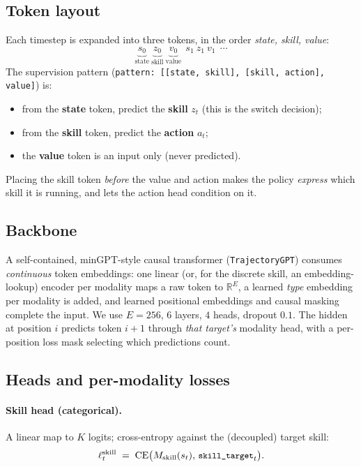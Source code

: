 \documentclass[11pt]{article}
\newcommand{\R}{\mathbb{R}}
\newcommand{\st}{s}
\newcommand{\skill}{z}
\newcommand{\code}[1]{\texttt{\small #1}}
\begin{document}
\subsection{Token layout}
Each timestep is expanded into three tokens, in the order \emph{state, skill, value}:
\begin{equation}
\underbrace{\st_0}_{\text{state}}\ \underbrace{\skill_0}_{\text{skill}}\
\underbrace{v_0}_{\text{value}}\ \ \st_1\ \skill_1\ v_1\ \ \cdots
\end{equation}
The supervision pattern (\code{pattern: [[state, skill], [skill, action], value]}) is:
\begin{itemize}
\item from the \textbf{state} token, predict the \textbf{skill} $\skill_t$ (this is
the switch decision);
\item from the \textbf{skill} token, predict the \textbf{action} $a_t$;
\item the \textbf{value} token is an input only (never predicted).
\end{itemize}
Placing the skill token \emph{before} the value and action makes the policy
\emph{express} which skill it is running, and lets the action head condition on it.

\subsection{Backbone}
A self-contained, minGPT-style causal transformer (\code{TrajectoryGPT}) consumes
\emph{continuous} token embeddings: one linear (or, for the discrete skill, an
embedding-lookup) encoder per modality maps a raw token to $\R^{E}$, a learned
\emph{type} embedding per modality is added, and learned positional embeddings and
causal masking complete the input. We use $E=256$, $6$ layers, $4$ heads, dropout
$0.1$. The hidden at position $i$ predicts token $i{+}1$ through \emph{that target's}
modality head, with a per-position loss mask selecting which predictions count.

\subsection{Heads and per-modality losses}
\paragraph{Skill head (categorical).}
A linear map to $K$ logits; cross-entropy against the (decoupled) target skill:
\begin{equation}
\ell^{\mathrm{skill}}_t \;=\; \mathrm{CE}\big(M_{\mathrm{skill}}(\st_t),\,
\code{skill\_target}_t\big).
\end{equation}
\end{document}
